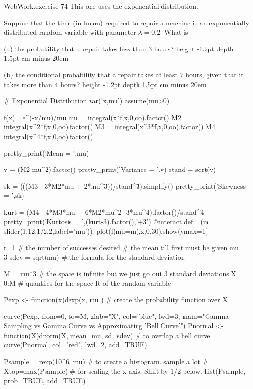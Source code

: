 \documentclass[10pt,]{book}
\newcommand{\fillin}[1]{\leavevmode\leaders\vrule height -1.2pt depth 1.5pt \hskip #1em minus #1em \null}
\numberwithin{equation}{section}
\begin{document}
%
\par
\hypertarget{p-1096}{}%
\begin{inlineexercise}{WebWork.}{exercise-74}%
\hypertarget{p-1097}{}%
This one uses the exponential distribution.%
\par\medskip
\hypertarget{p-1098}{}%
Suppose that the time (in hours) required to repair a machine is an exponentially distributed random variable with parameter \(\lambda = 0.2\). What is%
\par
\hypertarget{p-1099}{}%
(a) the probability that a repair takes less than \(3\) hours?  \fillin{20}%
\par
\hypertarget{p-1100}{}%
(b) the conditional probability that a repair takes at least \(7\) hours, given that it takes more than \(4\) hours?  \fillin{20}%
\end{inlineexercise}
%
\par
\hypertarget{p-1101}{}%
\leavevmode%
\begin{sageinput}
# Exponential Distribution
var('x,mu')
assume(mu>0)

f(x) =e^(-x/mu)/mu
mu = integral(x*f,x,0,oo).factor()
M2 = integral(x^2*f,x,0,oo).factor()
M3 = integral(x^3*f,x,0,oo).factor()
M4 = integral(x^4*f,x,0,oo).factor()

pretty_print('Mean = ',mu)

v = (M2-mu^2).factor()
pretty_print('Variance = ',v)
stand = sqrt(v)

sk = (((M3 - 3*M2*mu + 2*mu^3))/stand^3).simplify()
pretty_print('Skewness = ',sk)

kurt = (M4 - 4*M3*mu + 6*M2*mu^2 -3*mu^4).factor()/stand^4
pretty_print('Kurtosis = ',(kurt-3).factor(),'+3')
@interact
def _(m = slider(1,12,1/2,2,label='mu')):
    plot(f(mu=m),x,0,30).show(ymax=1)
\end{sageinput}
%
\par
\hypertarget{p-1102}{}%
\leavevmode%
\begin{sageinput}
r=1                # the number of successes desired
            # the mean till first must be given
mu = 3
sdev = sqrt(mu)  # the formula for the standard deviation

M = mu*3   # the space is infinite but we just go out 3 standard deviations
X = 0:M    # quantiles for the space R of the random variable 

Pexp <- function(x){dexp(x, mu )}  # create the probability function over X

curve(Pexp, from=0, to=M, xlab="X", col="blue", lwd=3,
 main="Gamma Sampling vs Gamma Curve vs Approximating 'Bell Curve'") 
Pnormal <- function(X){dnorm(X, mean=mu, sd=sdev)}   # to overlap a bell curve
curve(Pnormal, col="red", lwd=2, add=TRUE) 

Psample = rexp(10^6, mu)  # to create a histogram, sample a lot
# Xtop=max(Psample)          # for scaling the x-axis. Shift by 1/2 below.
hist(Psample, prob=TRUE, add=TRUE)
\end{sageinput}
\end{document}
